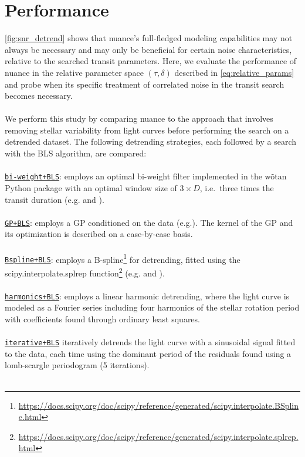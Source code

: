 \documentclass[modern,linenumbers]{aastex631}
\newcommand{\footlink}[1]{\footnote{\url{#1}}}
\begin{document}
\section{Performance}\label{results}
\autoref{fig:snr_detrend} shows that \textsf{nuance}'s full-fledged modeling capabilities may not always be necessary and may only be beneficial for certain noise characteristics, relative to the searched transit parameters. Here, we evaluate the performance of \textsf{nuance} in the relative parameter space $(\tau, \delta)$ described in \autoref{eq:relative_params} and probe when its specific treatment of correlated noise in the transit search becomes necessary.\\\\
We perform this study by comparing \textsf{nuance} to the approach that involves removing stellar variability from light curves before performing the search on a detrended dataset. The following detrending strategies, each followed by a search with the BLS algorithm, are compared:\\\\
\ul{\texttt{bi-weight+BLS}}: employs an optimal bi-weight filter implemented in the \textsf{wõtan} Python package with an optimal window size of $3\times D$, i.e.\, three times the transit duration (e.g.\;\citealt{wotan} and \citealt{Dransfield2024}).\\\\
\ul{\texttt{GP+BLS}}: employs a GP conditioned on the data (e.g.\;\citealt{Lienhard2020}). The kernel of the GP and its optimization is described on a case-by-case basis.\\\\
\ul{\texttt{Bspline+BLS}}: employs a B-spline\footlink{https://docs.scipy.org/doc/scipy/reference/generated/scipy.interpolate.BSpline.html} for detrending, fitted using the \textsf{scipy.interpolate.splrep} function\footlink{https://docs.scipy.org/doc/scipy/reference/generated/scipy.interpolate.splrep.html} (e.g.\;\citealt{wotan} and \citealt{Canocchi2023}).\\\\
\ul{\texttt{harmonics+BLS}}: employs a linear harmonic detrending, where the light curve is modeled as a Fourier series including four harmonics of the stellar rotation period with coefficients found through ordinary least squares.\\\\
\ul{\texttt{iterative+BLS}} iteratively detrends the light curve with a sinusoidal signal fitted to the data, each time using the dominant period of the residuals found using a lomb-scargle periodogram (5 iterations).\\\\
\end{document}
